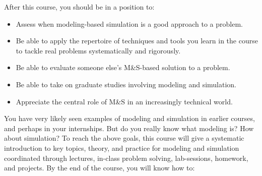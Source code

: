 \documentclass[11pt, a4paper]{article}
\begin{document}
After this course, you should be in a position to:
\begin{itemize}
\item Assess when modeling-based simulation is a good approach to a problem.
\item Be able to apply the repertoire of techniques and tools you learn in the course to tackle real problems systematically and rigorously.
\item Be able to evaluate someone else's M\&S-based solution to a problem.
\item Be able to take on graduate studies involving modeling and simulation.
\item Appreciate the central role of M\&S in an increasingly technical world.
\end{itemize}

You have very likely seen examples of modeling and simulation in earlier courses, and perhaps in your internships. But do you really know what modeling is? How about simulation? 
To reach the above goals, this course will give a systematic introduction to key topics, theory, and practice for modeling and simulation coordinated through lectures, in-class problem solving, lab-sessions, homework, and projects. By the end of the course, you will know how to:
\end{document}

